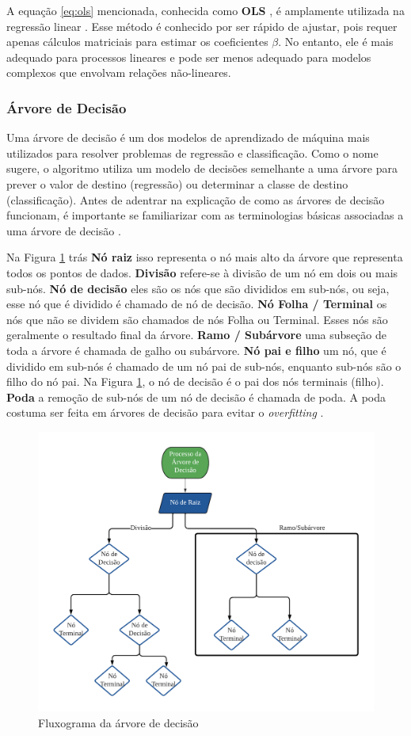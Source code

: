 A equação \eqref{eq:ols} mencionada, conhecida como \textbf{OLS} , é amplamente utilizada na regressão linear \cite{korstanje2021}. Esse método é conhecido por ser rápido de ajustar, pois requer apenas cálculos matriciais para estimar os coeficientes $\beta$. No entanto, ele é mais adequado para processos lineares e pode ser menos adequado para modelos complexos que envolvam relações não-lineares.


\subsubsection{\'Arvore de Decis\~ao }


Uma árvore de decisão é um dos modelos de aprendizado de máquina mais utilizados para resolver problemas de regressão e classificação. Como o nome sugere, o algoritmo utiliza um modelo de decisões semelhante a uma árvore para prever o valor de destino (regressão) ou determinar a classe de destino (classificação). Antes de adentrar na explicação de como as árvores de decisão funcionam, é importante se familiarizar com as terminologias básicas associadas a uma árvore de decisão \cite{decision}.

Na Figura \ref{fig:decison} trás \textbf{Nó raiz} isso representa o nó mais alto da árvore que representa todos os pontos de dados.
\textbf{Divisão} refere-se à divisão de um nó em dois ou mais sub-nós.
\textbf{Nó de decisão} eles são os nós que são divididos em sub-nós, ou seja, esse nó que é dividido é chamado de nó de decisão.
\textbf{Nó Folha / Terminal} os nós que não se dividem são chamados de nós Folha ou Terminal. Esses nós são geralmente o resultado final da árvore.
\textbf{Ramo / Subárvore} uma subseção de toda a árvore é chamada de galho ou subárvore.
\textbf{Nó pai e filho} um nó, que é dividido em sub-nós é chamado de um nó pai de sub-nós, enquanto sub-nós são o filho do nó pai. Na Figura \ref{fig:decison}, o nó de decisão é o pai dos nós terminais (filho).
\textbf{Poda} a remoção de sub-nós de um nó de decisão é chamada de poda. A poda costuma ser feita em árvores de decisão para evitar o \textit{overfitting}  \cite{decision}.

\begin{figure}[H]
	\centering
	\caption{Fluxograma da árvore de decisão}
	\label{fig:decison}
	\includegraphics[width=0.7\linewidth]{Modelos/Figuras/decison}
	
\end{figure}



